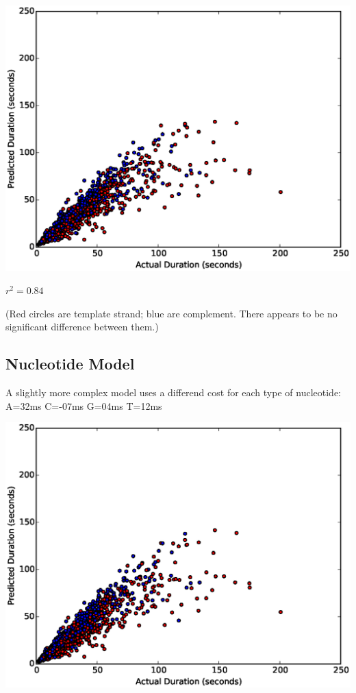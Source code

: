 \documentclass[11pt]{article}
\begin{document}
\includegraphics[width=\textwidth]{part11scatter0mer}

$r^2=0.84$


(Red circles are template strand; blue are complement.  There appears to be no significant difference between them.)

\newpage
\subsection*{Nucleotide Model}
A slightly more complex model uses a differend cost for each type of nucleotide: 
A=32ms 
C=-07ms 
G=04ms 
T=12ms 


\includegraphics[width=\textwidth]{part11scatter1mer}
\end{document}
